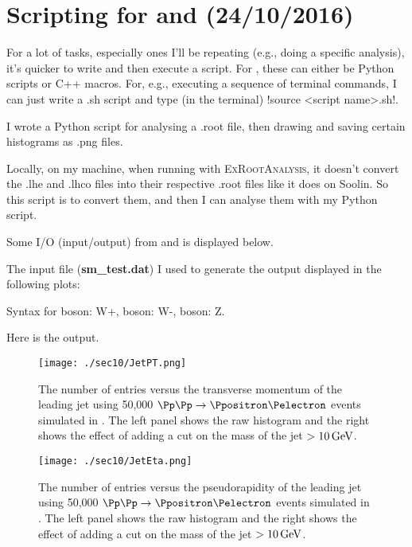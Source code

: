 
\chapter{Scripting for \madgraph and \ROOT (24/10/2016)}

For a lot of tasks, especially ones I'll be repeating (e.g., doing a specific analysis), it's quicker to write and then execute a script. For \ROOT, these can either be Python scripts or C++ macros. For, e.g., executing a sequence of terminal commands, I can just write a .sh script and type (in the terminal) !source <script name>.sh!.

I wrote a Python script for analysing a .root file, then drawing and saving certain histograms as .png files.



Locally, on my machine, when running \madgraph with \textsc{ExRootAnalysis}, it doesn't convert the .lhe and .lhco files into their respective .root files like it does on Soolin. So this script is to convert them, and then I can analyse them with my Python script.



Some I/O (input/output) from \madgraph and \ROOT is displayed below.

The input file (\textbf{sm\_test.dat}) I used to generate the output displayed in the following plots:



Syntax for \PWplus boson: W+, \PWminus boson: W-, \PZzero boson: Z.

Here is the output.

\begin{figure}[H]
\centering
\texttt{[image: ./sec10/JetPT.png]}
\caption{The number of entries versus the transverse momentum of the leading jet using 50,000 $\Pp\Pp \rightarrow \Ppositron \Pelectron$ events simulated in \madgraph. The left panel shows the raw histogram and the right shows the effect of adding a cut on the mass of the jet $>10\,\text{G\text{e\kern-0.15ex V}}$.}
\end{figure}

\begin{figure}[H]
\centering
\texttt{[image: ./sec10/JetEta.png]}
\caption{The number of entries versus the pseudorapidity of the leading jet using 50,000 $\Pp\Pp \rightarrow \Ppositron \Pelectron$ events simulated in \madgraph. The left panel shows the raw histogram and the right shows the effect of adding a cut on the mass of the jet $>10\,\text{G\text{e\kern-0.15ex V}}$.}
\end{figure}

